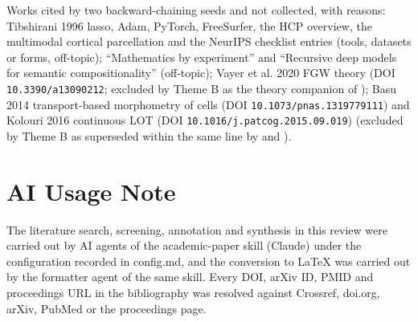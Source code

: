 \documentclass[journal,onecolumn]{IEEEtran}
\begin{document}
Works cited by two backward-chaining seeds and not collected, with reasons: Tibshirani 1996 lasso, Adam, PyTorch, FreeSurfer, the HCP overview, the multimodal cortical parcellation and the NeurIPS checklist entries (tools, datasets or forms, off-topic); ``Mathematics by experiment'' and ``Recursive deep models for semantic compositionality'' (off-topic); Vayer et al. 2020 FGW theory (DOI \nolinkurl{10.3390/a13090212}; excluded by Theme B as the theory companion of \cite{Vayer2019Structured}); Basu 2014 transport-based morphometry of cells (DOI \nolinkurl{10.1073/pnas.1319779111}) and Kolouri 2016 continuous LOT (DOI \nolinkurl{10.1016/j.patcog.2015.09.019}) (excluded by Theme B as superseded within the same line by \cite{Wang2013Linear} and \cite{Kundu2018Discovery}).

\section*{AI Usage Note}

The literature search, screening, annotation and synthesis in this review were carried out by AI agents of the academic-paper skill (Claude) under the configuration recorded in config.md, and the conversion to LaTeX was carried out by the formatter agent of the same skill. Every DOI, arXiv ID, PMID and proceedings URL in the bibliography was resolved against Crossref, doi.org, arXiv, PubMed or the proceedings page.



\end{document}
